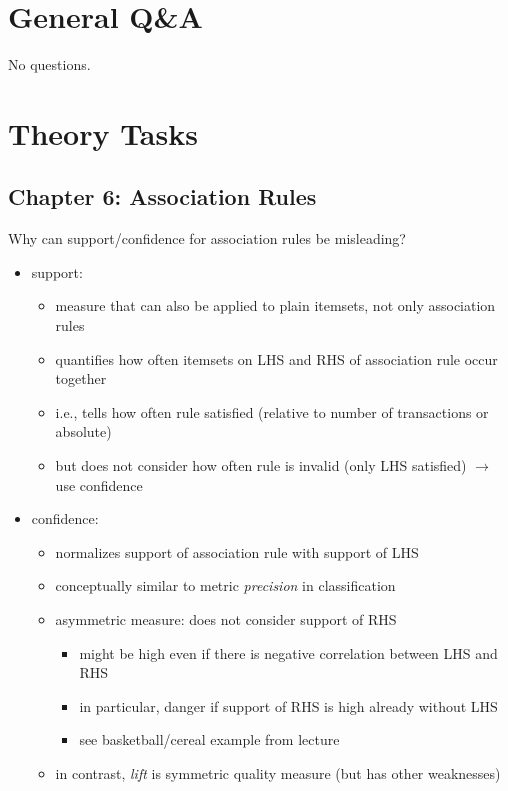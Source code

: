\documentclass[12pt]{article}
\begin{document}
\section*{General Q\&A}

No questions.

\section*{Theory Tasks}

\subsection*{Chapter 6: Association Rules}

\begin{question}
	Why can support/confidence for association rules be misleading?
\end{question}

\begin{itemize}[left=0pt, nosep]
	\item support:
	\begin{itemize}[left=0pt, nosep]
		\item measure that can also be applied to plain itemsets, not only association rules
		\item quantifies how often itemsets on LHS and RHS of association rule occur together
		\item i.e., tells how often rule satisfied (relative to number of transactions or absolute)
		\item but does not consider how often rule is invalid (only LHS satisfied) $\rightarrow$ use confidence
	\end{itemize}
	\item confidence:
	\begin{itemize}[left=0pt, nosep]
		\item normalizes support of association rule with support of LHS
		\item conceptually similar to metric \emph{precision} in classification
		\item asymmetric measure: does not consider support of RHS
		\begin{itemize}[left=0pt, nosep]
			\item might be high even if there is negative correlation between LHS and RHS
			\item in particular, danger if support of RHS is high already without LHS
			\item see basketball/cereal example from lecture
		\end{itemize}
		\item in contrast, \emph{lift} is symmetric quality measure (but has other weaknesses)
	\end{itemize}
\end{itemize}
\end{document}
